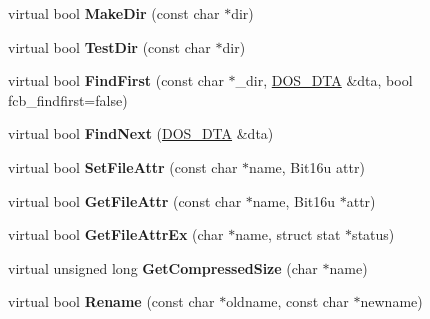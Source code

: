 \begin{DoxyCompactItemize}
\item 
\hypertarget{classlocalDrive_a06d94c67a748bda15000dd9fc86f9e38}{virtual bool {\bfseries Make\-Dir} (const char $\ast$dir)}\label{classlocalDrive_a06d94c67a748bda15000dd9fc86f9e38}

\item 
\hypertarget{classlocalDrive_acb08978e0c5cfa975033f33738ac1ed0}{virtual bool {\bfseries Test\-Dir} (const char $\ast$dir)}\label{classlocalDrive_acb08978e0c5cfa975033f33738ac1ed0}

\item 
\hypertarget{classlocalDrive_aa458c60b026b79e8e6e0c9247c4eb1ff}{virtual bool {\bfseries Find\-First} (const char $\ast$\-\_\-dir, \hyperlink{classDOS__DTA}{D\-O\-S\-\_\-\-D\-T\-A} \&dta, bool fcb\-\_\-findfirst=false)}\label{classlocalDrive_aa458c60b026b79e8e6e0c9247c4eb1ff}

\item 
\hypertarget{classlocalDrive_ad76629b03e06dd8f2fe5bde5458a81fb}{virtual bool {\bfseries Find\-Next} (\hyperlink{classDOS__DTA}{D\-O\-S\-\_\-\-D\-T\-A} \&dta)}\label{classlocalDrive_ad76629b03e06dd8f2fe5bde5458a81fb}

\item 
\hypertarget{classlocalDrive_a2417f4726ea0b1676393036389f6e9a7}{virtual bool {\bfseries Set\-File\-Attr} (const char $\ast$name, Bit16u attr)}\label{classlocalDrive_a2417f4726ea0b1676393036389f6e9a7}

\item 
\hypertarget{classlocalDrive_a60a489b8d435065127281ed28f5d74cc}{virtual bool {\bfseries Get\-File\-Attr} (const char $\ast$name, Bit16u $\ast$attr)}\label{classlocalDrive_a60a489b8d435065127281ed28f5d74cc}

\item 
\hypertarget{classlocalDrive_ad71edc74da1565310fc580d57637dc76}{virtual bool {\bfseries Get\-File\-Attr\-Ex} (char $\ast$name, struct stat $\ast$status)}\label{classlocalDrive_ad71edc74da1565310fc580d57637dc76}

\item 
\hypertarget{classlocalDrive_a1f9d1bd556ad2ac0796db37908f89961}{virtual unsigned long {\bfseries Get\-Compressed\-Size} (char $\ast$name)}\label{classlocalDrive_a1f9d1bd556ad2ac0796db37908f89961}

\item 
\hypertarget{classlocalDrive_ac734204b365b747fc90a50a00c8540ae}{virtual bool {\bfseries Rename} (const char $\ast$oldname, const char $\ast$newname)}\label{classlocalDrive_ac734204b365b747fc90a50a00c8540ae}


\end{DoxyCompactItemize}
